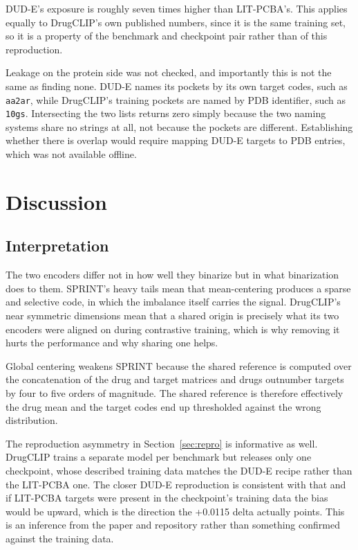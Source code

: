 \documentclass[10pt,a4paper]{article}
\begin{document}
DUD-E's exposure is roughly seven times higher than LIT-PCBA's. This applies equally to
DrugCLIP's own published numbers, since it is the same training set, so it is a property of
the benchmark and checkpoint pair rather than of this reproduction.

Leakage on the protein side was not checked, and importantly this is not the same as finding
none. DUD-E names its pockets by its own target codes, such as \texttt{aa2ar}, while
DrugCLIP's training pockets are named by PDB identifier, such as \texttt{10gs}. Intersecting
the two lists returns zero simply because the two naming systems share no strings at all, not
because the pockets are different. Establishing whether there is overlap would require mapping
DUD-E targets to PDB entries, which was not available offline.

\section{Discussion}\label{sec:discussion}

\subsection{Interpretation}

The two encoders differ not in how well they binarize but in what binarization does to them.
SPRINT's heavy tails mean that mean-centering produces a sparse and selective code, in which
the imbalance itself carries the signal. DrugCLIP's near symmetric dimensions mean that a 
shared origin is precisely what its two encoders were aligned on during contrastive training, 
which is why removing it hurts the performance and why sharing one helps.

Global centering weakens SPRINT because the shared reference is computed over the 
concatenation of the drug and target matrices and drugs outnumber targets by four to five
orders of magnitude. The shared reference is therefore effectively the drug mean and the 
target codes end up thresholded against the wrong distribution.

The reproduction asymmetry in Section~\ref{sec:repro} is informative as well. DrugCLIP trains a
separate model per benchmark but releases only one checkpoint, whose described training data 
matches the DUD-E recipe rather than the LIT-PCBA one. The closer DUD-E reproduction is 
consistent with that and if LIT-PCBA targets were present in the checkpoint's training data 
the bias would be upward, which is the direction the +0.0115 delta actually points. 
This is an inference from the paper and repository rather than something confirmed against 
the training data.
\end{document}
